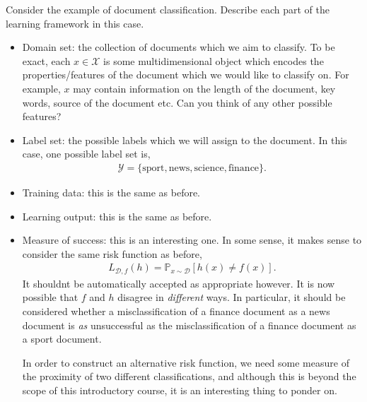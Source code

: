 \begin{exercise}
	\begin{problem}
	Consider the example of document classification. Describe each part of the learning framework in this case.
	\end{problem}
	\begin{solution}
		\begin{itemize}
			\item Domain set: the collection of documents which we aim to classify. To be exact, each $ x \in \mathcal{X} $ is some multidimensional object which encodes the properties/features of the document which we would like to classify on. For example, $ x $ may contain information on the length of the document, key words, source of the document etc. Can you think of any other possible features?
			\item Label set: the possible labels which we will assign to the document. In this case, one possible label set is,
			      \begin{align*}
				      \mathcal{Y} = \{ \text{sport}, \text{news}, \text{science}, \text{finance} \}.
			      \end{align*}
			\item Training data: this is the same as before.
			\item Learning output: this is the same as before.
			\item Measure of success: this is an interesting one. In some sense, it makes sense to consider the same risk function as before,
			      \begin{align*}
				      L_{\mathcal{D}, f}( h ) = \mathbb{P}_{x \sim \mathcal{D}}[ h ( x )\neq f ( x ) ].
			      \end{align*}
			      It shouldnt be automatically accepted as appropriate however. It is now possible that $ f $ and $ h $ disagree in \textit{different} ways. In particular, it should be considered whether a misclassification of a finance document as a news document is \textit{as} unsuccessful as the misclassification of a finance document as a sport document.

			      In order to construct an alternative risk function, we need some measure of the proximity of two different classifications, and although this is beyond the scope of this introductory course, it is an interesting thing to ponder on.
		\end{itemize}
	\end{solution}
\end{exercise}

